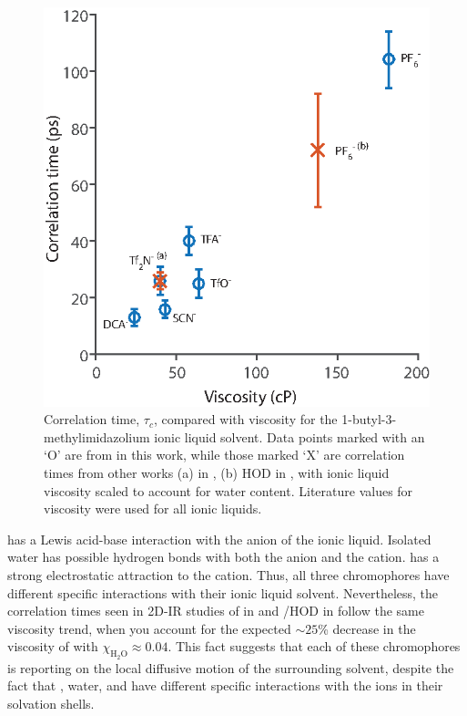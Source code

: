 \begin{figure}
	\includegraphics{./anions/fig10.eps}
	\caption[$\tau_c$-viscosity correlation with differing ionic liquid anion]{\label{fig:visc correlation}Correlation time, $\tau_c$, compared with viscosity for the 1-butyl-3-methylimidazolium ionic liquid solvent. Data points marked with an `O' are from  in this work, while those marked `X' are correlation times from other works (a)  in \ce{[Im_{4,1}][Tf2N]},\cite{Ren2014} (b) HOD in \ce{[Im_{4,1}][PF6]},\cite{wongJPCB-13} with ionic liquid viscosity scaled to account for water content.\cite{Li2007}  Literature values for viscosity were used for all ionic liquids.\cite{Tokuda2006a,Domanska2012,Sanchez2009}}
\end{figure}

 has a Lewis acid-base interaction with the anion of the ionic liquid. Isolated water has possible hydrogen bonds with both the anion and the cation.  has a strong electrostatic attraction to the cation. Thus, all three chromophores have different specific interactions with their ionic liquid solvent. Nevertheless, the correlation times seen in 2D-IR studies of \ce{[SCN]-}in \ce{[Im_{4,1}][Tf2N]}\cite{Ren2014} and /HOD in \ce{[Im_{4,1}][PF6]}\cite{wongJPCB-13} follow the same viscosity trend, when you account for the expected $\sim25$\% decrease in the viscosity of \ce{[Im_{4,1}][PF6]} with $\chi_{\text{H}_2\text{O}} \approx 0.04$.\cite{Li2007} This fact suggests that each of these chromophores is reporting on the local diffusive motion of the surrounding solvent, despite the fact that , water, and  have different specific interactions with the ions in their solvation shells.

